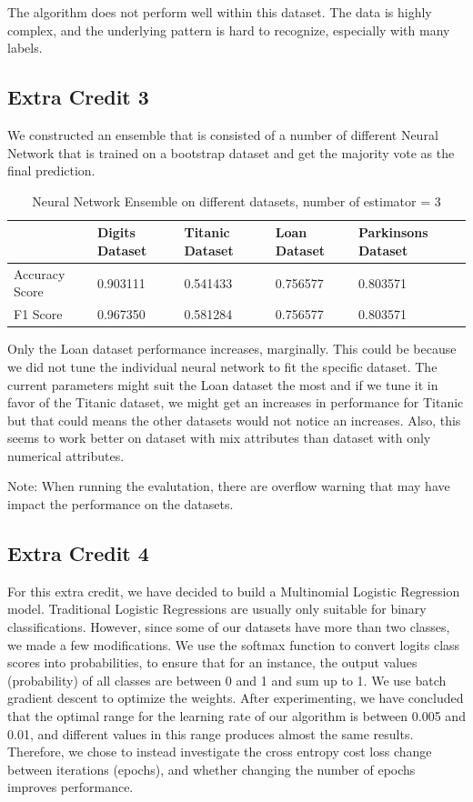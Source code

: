 \documentclass[letterpaper]{article}
\begin{document}
The algorithm does not perform well within this dataset. The data is highly complex, and the underlying pattern is hard to recognize, especially with many labels.
\subsection*{Extra Credit 3}

We constructed an ensemble that is consisted of a number of different Neural Network that is trained on a bootstrap dataset and get the majority vote
as the final prediction.

\begin{table}[H]
	\centering
	\begin{tabular}{|l|l|l|l|l|}
		\hline
		               & Digits Dataset & Titanic Dataset & Loan Dataset & Parkinsons Dataset \\ \hline
		Accuracy Score & 0.903111       & 0.541433        & 0.756577     & 0.803571           \\ \hline
		F1 Score       & 0.967350       & 0.581284        & 0.756577     & 0.803571           \\ \hline
	\end{tabular}
	\caption{Neural Network Ensemble on different datasets, number of estimator = 3}
\end{table}

Only the Loan dataset performance increases, marginally. This could be because we did not tune the individual neural network to fit the specific dataset.
The current parameters might suit the Loan dataset the most and if we tune it in favor of the Titanic dataset, we might get an increases in performance
for Titanic but that could means the other datasets would not notice an increases. Also, this seems to work better on dataset with mix attributes than
dataset with only numerical attributes.

Note: When running the evalutation, there are overflow warning that may have impact the performance on the datasets.

\subsection*{Extra Credit 4}

For this extra credit, we have decided to build a Multinomial Logistic Regression model. Traditional Logistic Regressions are usually only suitable for binary classifications.
However, since some of our datasets have more than two classes, we made a few modifications. 
We use the softmax function to convert logits class scores into probabilities, to ensure that for an instance, the output values (probability) of all classes are between 0 and 1 and sum up to 1.
We use batch gradient descent to optimize the weights. After experimenting, we have concluded that the optimal range for the learning rate of our algorithm is between 0.005 and 0.01, and different values in this range produces almost the same results.
Therefore, we chose to instead investigate the cross entropy cost loss change between iterations (epochs), and whether changing the number of epochs improves performance. 
\end{document}
